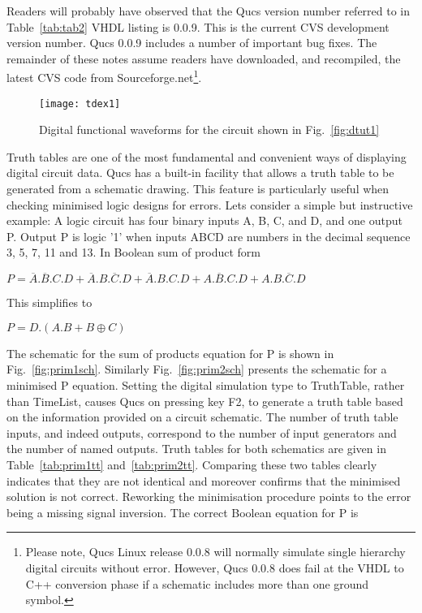 Readers will probably have observed that the Qucs version number
referred to in Table~\ref{tab:tab2} VHDL listing is 0.0.9.  This is
the current CVS development version number.  Qucs 0.0.9 includes a
number of important bug fixes.  The remainder of these notes assume
readers have downloaded, and recompiled, the latest CVS code from
Sourceforge.net\footnote{Please note, Qucs Linux release 0.0.8 will
normally simulate single hierarchy digital circuits without error.
However, Qucs 0.0.8 does fail at the VHDL to C++ conversion phase if a
schematic includes more than one ground symbol.}.

\begin{figure}[ht]
  \centering
  \texttt{[image: tdex1]}
  \caption{Digital functional waveforms for the circuit shown in Fig.~\ref{fig:dtut1}}
  \label{fig:tdex1}
\end{figure}
\FloatBarrier


Truth tables are one of the most fundamental and convenient ways of
displaying digital circuit data.  Qucs has a built-in facility that
allows a truth table to be generated from a schematic drawing.  This
feature is particularly useful when checking minimised logic designs
for errors.  Lets consider a simple but instructive example: A logic
circuit has four binary inputs A, B, C, and D, and one output P.
Output P is logic '1' when inputs ABCD are numbers in the decimal 
sequence 3, 5, 7, 11 and 13. In Boolean sum of product form \\
\begin{center}
\begin{large}$P=\overline{A}.\overline{B}.C.D+
\overline{A}.B.\overline{C}.D+\overline{A}.B.C.D+A.\overline{B}.C.D+
A.B.\overline{C}.D$
\end{large}\end{center}

This simplifies to\\
\begin{center}
\begin{large}$P=D.(A.B+B \oplus C )$\end{large}
\end{center}
The schematic for the sum of products equation for P is shown in
Fig.~\ref{fig:prim1sch}.  Similarly Fig.~\ref{fig:prim2sch} presents
the schematic for a minimised P equation.  Setting the digital
simulation type to TruthTable, rather than TimeList, causes Qucs on
pressing key F2, to generate a truth table based on the information
provided on a circuit schematic. The number of truth table inputs, and
indeed outputs, correspond to the number of input generators and the
number of named outputs. Truth tables for both schematics are given in
Table~\ref{tab:prim1tt} and~\ref{tab:prim2tt}. Comparing these two
tables clearly indicates that they are not identical and moreover
confirms that the minimised solution is not correct.  Reworking the
minimisation procedure points to the error being a missing signal
inversion.  The correct Boolean equation for P is

